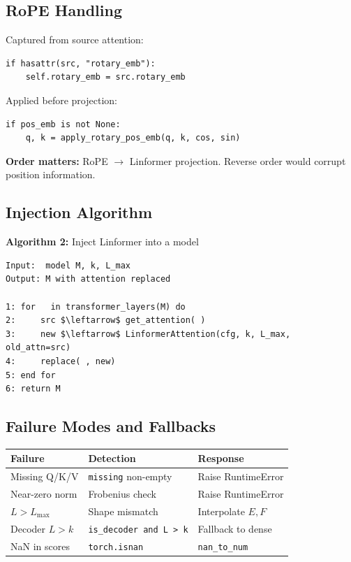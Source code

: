 \subsection{RoPE Handling}

Captured from source attention:

\begin{lstlisting}
if hasattr(src, "rotary_emb"):
    self.rotary_emb = src.rotary_emb
\end{lstlisting}

Applied before projection:

\begin{lstlisting}
if pos_emb is not None:
    q, k = apply_rotary_pos_emb(q, k, cos, sin)
\end{lstlisting}

\textbf{Order matters:} RoPE $\to$ Linformer projection. Reverse order would corrupt 
position information.

\subsection{Injection Algorithm}

\textbf{Algorithm 2:} Inject Linformer into a model
\begin{lstlisting}
Input:  model M, k, L_max
Output: M with attention replaced

1: for   in transformer_layers(M) do
2:     src $\leftarrow$ get_attention( )
3:     new $\leftarrow$ LinformerAttention(cfg, k, L_max, old_attn=src)
4:     replace( , new)
5: end for
6: return M
\end{lstlisting}

\subsection{Failure Modes and Fallbacks}

\begin{table}[H]
\centering
\small
\begin{tabular}{lll}
\toprule
\textbf{Failure} & \textbf{Detection} & \textbf{Response} \\
\midrule
Missing Q/K/V & \texttt{missing} non-empty & Raise RuntimeError \\
Near-zero norm & Frobenius check & Raise RuntimeError \\
$L > L_\text{max}$ & Shape mismatch & Interpolate $E, F$ \\
Decoder $L > k$ & \texttt{is\_decoder and L > k} & Fallback to dense \\
NaN in scores & \texttt{torch.isnan} & \texttt{nan\_to\_num} \\
\bottomrule
\end{tabular}
\end{table}

